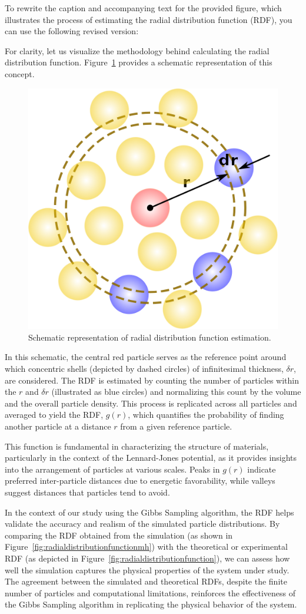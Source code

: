 \documentclass{report}
\begin{document}
To rewrite the caption and accompanying text for the provided figure, which illustrates the process of estimating the radial distribution function (RDF), you can use the following revised version:

For clarity, let us visualize the methodology behind calculating the radial distribution function. Figure~\ref{fig:rdf_explanation} provides a schematic representation of this concept.

\begin{figure}[H]
	\centering
	\includegraphics[width=0.3\linewidth]{./Figures/MCMC/LennardJones/rdf_explanation.png}
	\caption{Schematic representation of radial distribution function estimation.}
	\label{fig:rdf_explanation}
\end{figure}

In this schematic, the central red particle serves as the reference point around which concentric shells (depicted by dashed circles) of infinitesimal thickness, \( \delta r \), are considered. The RDF is estimated by counting the number of particles within the \(r\) and \( \delta r \) (illustrated as blue circles) and normalizing this count by the volume and the overall particle density. This process is replicated across all particles and averaged to yield the RDF, \( g(r) \), which quantifies the probability of finding another particle at a distance \( r \) from a given reference particle.

This function is fundamental in characterizing the structure of materials, particularly in the context of the Lennard-Jones potential, as it provides insights into the arrangement of particles at various scales. Peaks in \( g(r) \) indicate preferred inter-particle distances due to energetic favorability, while valleys suggest distances that particles tend to avoid.

In the context of our study using the Gibbs Sampling algorithm, the RDF helps validate the accuracy and realism of the simulated particle distributions. By comparing the RDF obtained from the simulation (as shown in Figure~\ref{fig:radialdistributionfunctionmh}) with the theoretical or experimental RDF (as depicted in Figure~\ref{fig:radialdistributionfunction}), we can assess how well the simulation captures the physical properties of the system under study. The agreement between the simulated and theoretical RDFs, despite the finite number of particles and computational limitations, reinforces the effectiveness of the Gibbs Sampling algorithm in replicating the physical behavior of the system.
\end{document}
